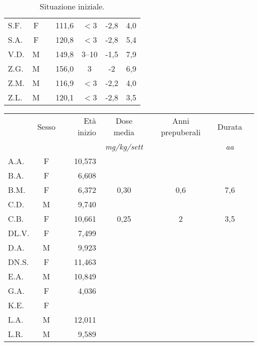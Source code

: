 \begin{table}[!h]
\begin{center}
\begin{tabular}{lcccccc}
S.F.	& F &  				  		& 111,6 & $<$3  & -2,8 & 4,0 \\
S.A.	& F &  				  		& 120,8 & $<$3  & -2,8 & 5,4 \\
V.D.	& M &  				  		& 149,8 & 3--10 & -1,5 & 7,9 \\
Z.G.	& M &  				  		& 156,0 & 3     & -2   & 6,9  \\
Z.M.	& M &  				  		& 116,9 & $<$3  & -2,2 & 4,0 \\
Z.L.	& M &  				  		& 120,1 & $<$3  & -2,8 & 3,5 \\
\bottomrule
\end{tabular}
\end{center}
\caption{Situazione iniziale.}
\label{tab:SituazioneIniziale}
\end{table}


\begin{table}[!h]
\begin{center}
\begin{tabular}{lcrcccl}
\toprule
 &      Sesso &   Età inizio  & Dose media 	& Anni prepuberali & Durata \\
 &     &				  & \emph{mg/kg/sett}	& & \emph{aa} \\
\midrule
A.A.	& F & 10,573  	      &  		&                  &     \\
B.A.	& F & 6,608   	      &             &                  &     \\
B.M.	& F & 6,372   	      & 0,30        & 0,6              & 7,6 \\
C.D.	& M & 9,740   	      &             &                  &     \\
C.B.	& F & 10,661  	      & 0,25        & 2                & 3,5 \\
DL.V.	& F & 7,499   	      &             &                  &     \\
D.A.	& M & 9,923   	      &             &                  &     \\
DN.S.	& F & 11,463  	      &             &                  &     \\
E.A.	& M & 10,849  	      &             &                  &     \\
G.A.	& F & 4,036   	      &             &                  &     \\
K.E.	& F &         	      &             &                  &     \\
L.A.	& M & 12,011  	      &             &                  &     \\
L.R.	& M & 9,589   	      &             &                  &     \\

\end{tabular}
\end{center}
\end{table}

